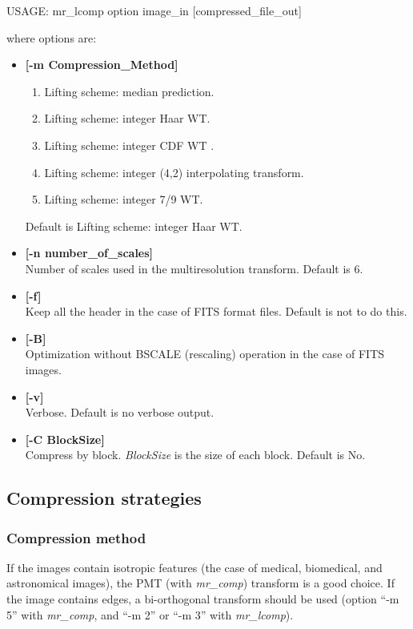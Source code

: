 {\bf \begin{center}
 USAGE: mr\_lcomp option image\_in [compressed\_file\_out]
\end{center}}
where options are:
\begin{itemize}     
\baselineskip=0.4truecm
\item {\bf [-m Compression\_Method] }
\begin{enumerate}
\baselineskip=0.4truecm
\item  Lifting scheme: median prediction.
\item  Lifting scheme: integer Haar WT.
\item  Lifting scheme: integer CDF WT    .        
\item  Lifting scheme: integer (4,2) interpolating transform.
\item  Lifting scheme: integer 7/9 WT.
\end{enumerate} 
Default is Lifting scheme: integer Haar WT.
\item {\bf [-n number\_of\_scales]}  \\
Number of scales used in the multiresolution transform. Default is 6.
\item {\bf [-f]} \\
Keep all the header in the case of FITS format files. Default is not to do 
this.
\item {\bf [-B]} \\
Optimization without BSCALE (rescaling) operation in the case of FITS images.
\item {\bf [-v]} \\
Verbose. Default is no verbose output.
\item {\bf [-C BlockSize] } \\
Compress by block. {\em BlockSize} is the size of each block.
Default is No.
\end{itemize}

\newpage
\subsection{Compression strategies}

\subsubsection*{Compression method}
If the images contain isotropic features (the case of
medical, biomedical, and astronomical images), the PMT (with {\em mr\_comp})
transform
is a good choice. If the image contains edges, a bi-orthogonal transform should
be used (option ``-m 5'' with {\em mr\_comp}, and ``-m 2'' or ``-m 3'' with
{\em mr\_lcomp}). 

